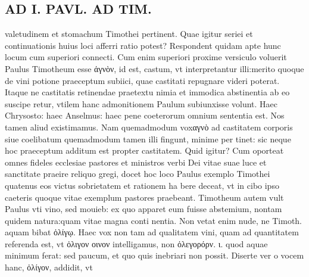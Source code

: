 \documentclass{article}
\begin{document}
\begin{pages}
\section*{AD I. PAVL. AD TIM. }
\marginpar{[ p.368 ]}\pstart valetudinem et stomachum Timothei pertinent. Quae igitur seriei et continuationis huius loci afferri ratio potest? Respondent quidam apte hunc locum cum superiori connecti. Cum enim superiori proxime versiculo voluerit Paulus Timotheum esse ἀγνὸν, id est, castum, vt interpretantur illi:merito quoque de vini potione praeceptum subiici, quae castitati repugnare videri poterat. Itaque ne castitatis retinendae praetextu nimia et immodica abstinentia ab eo suscipe retur, vtilem hanc admonitionem Paulum subiunxisse volunt. Haec Chrysosto: haec Anselmus: haec pene coeterorum omnium sententia est. Nos tamen aliud existimamus. Nam quemadmodum voxαγνὸ ad castitatem corporis siue coelibatum quemadmodum tamen illi fingunt, minime per tinet: sic neque hoc praeceptum additum est propter castitatem. Quid igitur? Cum oporteat omnes fideles ecclesiae pastores et ministros verbi Dei vitae suae luce et sanctitate praeire reliquo gregi, docet hoc loco Paulus exemplo Timothei quatenus eos victus sobrietatem et rationem ha bere deceat, vt in cibo ipso caeteris quoque vitae exemplum pastores praebeant. Timotheum autem vult Paulus vti vino, sed mouieb: ex quo apparet eum fuisse abstemium, nontam quidem natura:quam vitae magna conti nentia. Non vetat enim nude, ne Timoth. aquam bibat ὀλίγῳ. Haec vox non tam ad qualitatem vini, quam ad quantitatem referenda est, vt ὀλιγον οινον intelligamus, non ὀλεγορόρν. ι. quod aquae minimum ferat: sed paucum, et quo quis inebriari non possit. Diserte ver o vocem hanc, ὀλίγον, addidit, vt  \pend

\end{pages}
\end{document}
